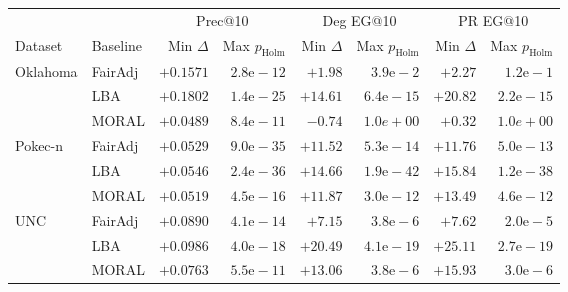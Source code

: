 \begin{tabular}{llrrrrrr}
\toprule
 & & \multicolumn{2}{c}{Prec@10} & \multicolumn{2}{c}{Deg EG@10} & \multicolumn{2}{c}{PR EG@10} \\
\cmidrule(lr){3-4}\cmidrule(lr){5-6}\cmidrule(lr){7-8}
Dataset & Baseline & Min $\Delta$ & Max $p_{\mathrm{Holm}}$ & Min $\Delta$ & Max $p_{\mathrm{Holm}}$ & Min $\Delta$ & Max $p_{\mathrm{Holm}}$ \\
\midrule
Oklahoma & FairAdj & $+0.1571$ & $2.8\mathrm{e}{-}12$ & $+1.98$ & $3.9\mathrm{e}{-}2$ & $+2.27$ & $1.2\mathrm{e}{-}1$ \\
 & LBA & $+0.1802$ & $1.4\mathrm{e}{-}25$ & $+14.61$ & $6.4\mathrm{e}{-}15$ & $+20.82$ & $2.2\mathrm{e}{-}15$ \\
 & MORAL & $+0.0489$ & $8.4\mathrm{e}{-}11$ & $-0.74$ & $1.0e+00$ & $+0.32$ & $1.0e+00$ \\
\addlinespace[2pt]
Pokec-n & FairAdj & $+0.0529$ & $9.0\mathrm{e}{-}35$ & $+11.52$ & $5.3\mathrm{e}{-}14$ & $+11.76$ & $5.0\mathrm{e}{-}13$ \\
 & LBA & $+0.0546$ & $2.4\mathrm{e}{-}36$ & $+14.66$ & $1.9\mathrm{e}{-}42$ & $+15.84$ & $1.2\mathrm{e}{-}38$ \\
 & MORAL & $+0.0519$ & $4.5\mathrm{e}{-}16$ & $+11.87$ & $3.0\mathrm{e}{-}12$ & $+13.49$ & $4.6\mathrm{e}{-}12$ \\
\addlinespace[2pt]
UNC & FairAdj & $+0.0890$ & $4.1\mathrm{e}{-}14$ & $+7.15$ & $3.8\mathrm{e}{-}6$ & $+7.62$ & $2.0\mathrm{e}{-}5$ \\
 & LBA & $+0.0986$ & $4.0\mathrm{e}{-}18$ & $+20.49$ & $4.1\mathrm{e}{-}19$ & $+25.11$ & $2.7\mathrm{e}{-}19$ \\
 & MORAL & $+0.0763$ & $5.5\mathrm{e}{-}11$ & $+13.06$ & $3.8\mathrm{e}{-}6$ & $+15.93$ & $3.0\mathrm{e}{-}6$ \\
\bottomrule
\end{tabular}
